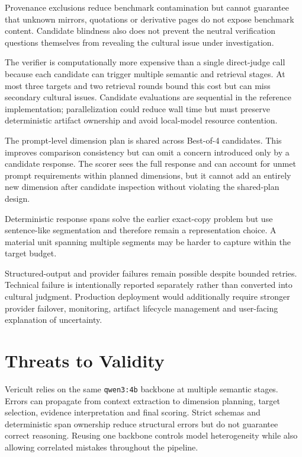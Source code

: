 Provenance exclusions reduce benchmark contamination but cannot guarantee that unknown mirrors, quotations or derivative pages do not expose benchmark content. Candidate blindness also does not prevent the neutral verification questions themselves from revealing the cultural issue under investigation.

The verifier is computationally more expensive than a single direct-judge call because each candidate can trigger multiple semantic and retrieval stages. At most three targets and two retrieval rounds bound this cost but can miss secondary cultural issues. Candidate evaluations are sequential in the reference implementation; parallelization could reduce wall time but must preserve deterministic artifact ownership and avoid local-model resource contention.

The prompt-level dimension plan is shared across Best-of-4 candidates. This improves comparison consistency but can omit a concern introduced only by a candidate response. The scorer sees the full response and can account for unmet prompt requirements within planned dimensions, but it cannot add an entirely new dimension after candidate inspection without violating the shared-plan design.

Deterministic response spans solve the earlier exact-copy problem but use sentence-like segmentation and therefore remain a representation choice. A material unit spanning multiple segments may be harder to capture within the target budget.

Structured-output and provider failures remain possible despite bounded retries. Technical failure is intentionally reported separately rather than converted into cultural judgment. Production deployment would additionally require stronger provider failover, monitoring, artifact lifecycle management and user-facing explanation of uncertainty.

\section{Threats to Validity}
Vericult relies on the same \texttt{qwen3:4b} backbone at multiple semantic stages. Errors can propagate from context extraction to dimension planning, target selection, evidence interpretation and final scoring. Strict schemas and deterministic span ownership reduce structural errors but do not guarantee correct reasoning. Reusing one backbone controls model heterogeneity while also allowing correlated mistakes throughout the pipeline.

